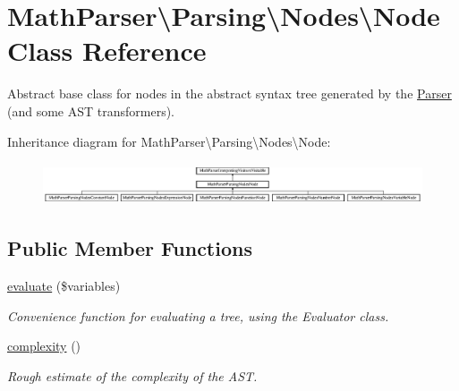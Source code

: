 \hypertarget{classMathParser_1_1Parsing_1_1Nodes_1_1Node}{\section{Math\-Parser\textbackslash{}Parsing\textbackslash{}Nodes\textbackslash{}Node Class Reference}
\label{classMathParser_1_1Parsing_1_1Nodes_1_1Node}
}


Abstract base class for nodes in the abstract syntax tree generated by the \hyperlink{classMathParser_1_1Parsing_1_1Parser}{Parser} (and some A\-S\-T transformers).  


Inheritance diagram for Math\-Parser\textbackslash{}Parsing\textbackslash{}Nodes\textbackslash{}Node\-:\begin{figure}[H]
\begin{center}
\leavevmode
\includegraphics[height=1.249071cm]{classMathParser_1_1Parsing_1_1Nodes_1_1Node}
\end{center}
\end{figure}
\subsection*{Public Member Functions}
\begin{DoxyCompactItemize}
\item 
\hyperlink{classMathParser_1_1Parsing_1_1Nodes_1_1Node_aa365c3dd42885fc67f00f88578994788}{evaluate} (\$variables)
\begin{DoxyCompactList}\small\item\em Convenience function for evaluating a tree, using the Evaluator class. \end{DoxyCompactList}\item 
\hyperlink{classMathParser_1_1Parsing_1_1Nodes_1_1Node_a607d20250ecf48ac6842531cde46daff}{complexity} ()
\begin{DoxyCompactList}\small\item\em Rough estimate of the complexity of the A\-S\-T. \end{DoxyCompactList}\end{DoxyCompactItemize}

